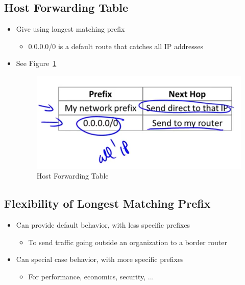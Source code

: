 \documentclass[12pt]{ctexart}   %
\begin{document}
	\subsection{Host Forwarding Table}
	\begin{itemize}
		\item Give using longest matching prefix
		\begin{itemize}
			\item 0.0.0.0/0 is a default route that catches all IP addresses
		\end{itemize}
		\item See Figure~\ref{fig:4-5-3}
		
		\begin{figure}[h!] %
		\centering
		 \includegraphics[scale=0.7]{images/4-5-3}
		\caption{Host Forwarding Table}
		 \label{fig:4-5-3}
		 \end{figure}
	\end{itemize}
	
	\subsection{Flexibility of Longest Matching Prefix}
	\begin{itemize}
		\item Can provide default behavior, with less specific prefixes
		\begin{itemize}
			\item To send traffic going outside an organization to a border router
		\end{itemize}
		
		\item Can special case behavior, with more specific prefixes
		\begin{itemize}
			\item For performance, economics, security, ...
		\end{itemize}
	\end{itemize}
	
\end{document}
